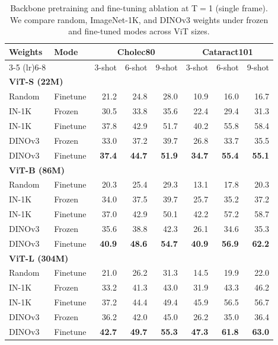 \begin{table}[t]
\centering
\caption{Backbone pretraining and fine-tuning ablation at T$=$1 (single frame).
We compare random, ImageNet-1K, and DINOv3 weights under frozen and fine-tuned modes across ViT sizes.}
\label{tab:dinov3_finetune}
\footnotesize
\setlength{\tabcolsep}{2.4pt}
\begin{tabular}{@{}l l|rrr|rrr@{}}
\toprule
\multirow{2}{*}{Weights} & \multirow{2}{*}{Mode} & \multicolumn{3}{c}{Cholec80} & \multicolumn{3}{c}{Cataract101} \\
\cmidrule(lr){3-5} \cmidrule(lr){6-8}
& & 3-shot & 6-shot & 9-shot & 3-shot & 6-shot & 9-shot \\
\midrule
\multicolumn{8}{l}{\textbf{ViT-S (22M)}} \\
\quad Random  & Finetune & 21.2 & 24.8 & 28.0 & 10.9 & 16.0 & 16.7 \\
\quad IN-1K    & Frozen   & 30.5 & 33.8 & 35.6 & 22.4 & 29.4 & 31.3 \\
\quad IN-1K    & Finetune & 37.8 & 42.9 & 51.7 & 40.2 & 55.8 & 58.4 \\
\quad DINOv3   & Frozen   & 33.0 & 37.2 & 39.7 & 26.8 & 33.7 & 35.5 \\
\quad DINOv3   & Finetune & \textbf{37.4} & \textbf{44.7} & \textbf{51.9} & \textbf{34.7} & \textbf{55.4} & \textbf{55.1} \\
\midrule
\multicolumn{8}{l}{\textbf{ViT-B (86M)}} \\
\quad Random  & Finetune & 20.3 & 25.4 & 29.3 & 13.1 & 17.8 & 20.3 \\
\quad IN-1K    & Frozen   & 34.0 & 37.5 & 39.7 & 25.7 & 35.2 & 37.2 \\
\quad IN-1K    & Finetune & 37.0 & 42.9 & 50.1 & 42.2 & 57.2 & 58.7 \\
\quad DINOv3   & Frozen   & 35.6 & 38.8 & 42.3 & 26.1 & 34.6 & 35.3 \\
\quad DINOv3   & Finetune & \textbf{40.9} & \textbf{48.6} & \textbf{54.7} & \textbf{40.9} & \textbf{56.9} & \textbf{62.2} \\
\midrule
\multicolumn{8}{l}{\textbf{ViT-L (304M)}} \\
\quad Random  & Finetune & 21.0 & 26.2 & 31.3 & 14.5 & 19.9 & 22.0 \\
\quad IN-1K    & Frozen   & 33.2 & 41.3 & 43.0 & 31.9 & 43.3 & 46.2 \\
\quad IN-1K    & Finetune & 37.2 & 44.4 & 49.4 & 45.9 & 56.5 & 56.7 \\
\quad DINOv3   & Frozen   & 36.2 & 42.0 & 45.0 & 26.2 & 35.0 & 36.4 \\
\quad DINOv3   & Finetune & \textbf{42.7} & \textbf{49.7} & \textbf{55.3} & \textbf{47.3} & \textbf{61.8} & \textbf{63.0} \\
\bottomrule
\end{tabular}
\end{table}
